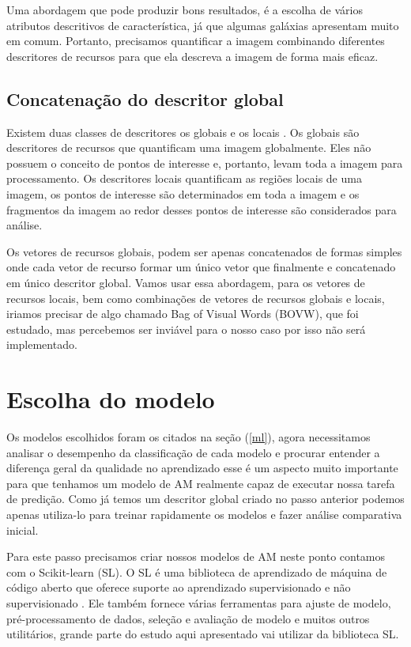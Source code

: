 Uma abordagem que pode produzir bons resultados, é a escolha de vários atributos descritivos de característica, já que algumas galáxias apresentam muito em comum. Portanto, precisamos quantificar a imagem combinando diferentes descritores de recursos para que ela descreva a imagem de forma mais eficaz. 

\subsection{Concatenação do descritor global}

Existem duas classes de descritores os globais e os locais \cite{Sonka1998}. Os globais são descritores de recursos que quantificam uma imagem globalmente. Eles não possuem o conceito de pontos de interesse e, portanto, levam toda a imagem para processamento. Os descritores locais quantificam as regiões locais de uma imagem, os pontos de interesse são determinados em toda a imagem e os fragmentos da imagem ao redor desses pontos de interesse são considerados para análise. 

Os vetores de recursos globais, podem ser apenas concatenados de formas simples onde cada vetor de recurso formar um único vetor que finalmente e concatenado em único descritor global. Vamos usar essa abordagem, para os vetores de recursos locais, bem como combinações de vetores de recursos globais e locais, iriamos precisar de algo chamado Bag of Visual Words (BOVW), que foi estudado, mas percebemos ser inviável para o nosso caso por isso não será implementado. 

\section{Escolha do modelo} 

 Os modelos escolhidos foram os citados na seção (\ref{ml}), agora necessitamos analisar o desempenho da classificação de cada modelo e procurar entender a diferença geral da qualidade no aprendizado esse é um aspecto muito importante para que tenhamos um modelo de AM realmente capaz de executar nossa tarefa de predição. Como já temos um descritor global criado no passo anterior podemos apenas utiliza-lo para treinar rapidamente os modelos e fazer análise comparativa inicial. 

 Para este passo precisamos criar nossos modelos de AM neste ponto contamos com o Scikit-learn (SL). O SL é uma biblioteca de aprendizado de máquina de código aberto que oferece suporte ao aprendizado supervisionado e não supervisionado \cite{scikit-learn}. Ele também fornece várias ferramentas para ajuste de modelo, pré-processamento de dados, seleção e avaliação de modelo e muitos outros utilitários, grande parte do estudo aqui apresentado vai utilizar da biblioteca SL. 

